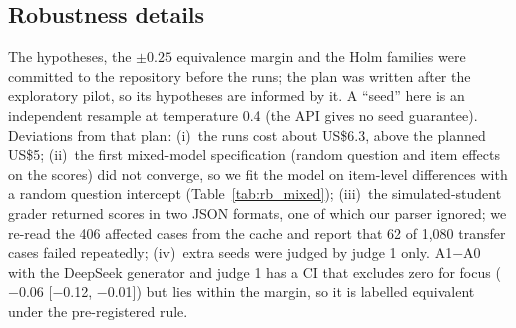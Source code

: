 \documentclass[11pt]{article}
\begin{document}
\subsection{Robustness details}
\label{app:robust}
The hypotheses, the $\pm 0.25$ equivalence margin and the Holm families were committed to the repository before the runs; the plan was written after the exploratory pilot, so its hypotheses are informed by it. A ``seed'' here is an independent resample at temperature 0.4 (the API gives no seed guarantee). Deviations from that plan: (i)~the runs cost about US\$6.3, above the planned US\$5; (ii)~the first mixed-model specification (random question and item effects on the scores) did not converge, so we fit the model on item-level differences with a random question intercept (Table~\ref{tab:rb_mixed}); (iii)~the simulated-student grader returned scores in two JSON formats, one of which our parser ignored; we re-read the 406 affected cases from the cache and report that 62 of 1{,}080 transfer cases failed repeatedly; (iv)~extra seeds were judged by judge 1 only. A1$-$A0 with the DeepSeek generator and judge 1 has a CI that excludes zero for focus ($-0.06$ [$-$0.12, $-$0.01]) but lies within the margin, so it is labelled equivalent under the pre-registered rule.

\begin{table}[h]
\centering\footnotesize
\resizebox{\columnwidth}{!}{}
\caption{Agreement between the two judges on the pilot (900 text ratings per dimension). QWK: quadratic weighted kappa.}
\label{tab:rb_agree}
\end{table}

\begin{table}[h]
\centering\footnotesize
\resizebox{\columnwidth}{!}{}
\caption{Mixed-effects model on item-level differences (random question intercept) vs.\ cluster bootstrap; $\hat\tau_q$: estimated between-question standard deviation of the effect.}
\label{tab:rb_mixed}
\end{table}

\begin{table}[h]
\centering\footnotesize
\resizebox{\columnwidth}{!}{}
\caption{A1$-$S when the judge does not see the student's answer (study material for a typical grade 8--9 student); 95\% question-clustered CIs.}
\label{tab:rb_blind}
\end{table}

\begin{table}[h]
\centering\footnotesize
\resizebox{\columnwidth}{!}{}
\caption{Answers that were already mostly correct (gold grade 3, 60 items): A1$-$S.}
\label{tab:rb_nota3}
\end{table}
\end{document}
